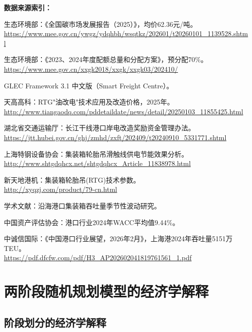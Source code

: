 \documentclass[12pt,a4paper]{article}
\newcommand{\手批注}[2]{\textcolor{#1}{\text{\kaishu #2}}}
\newcommand{\一阶段}{\textcolor{firststage}{\text{\kaishu （一阶段）}}}
\newcommand{\二阶段}{\textcolor{secondstage}{\text{\kaishu （二阶段）}}}
\begin{document}
\vspace{1em}
\noindent\textbf{数据来源索引：}
\begin{footnotesize}
\begin{enumerate}[itemsep=0.15em,leftmargin=1.5em,label={[\arabic*]}]
    \item 生态环境部：《全国碳市场发展报告（2025）》，均价62.36元/吨。\\ \url{https://www.mee.gov.cn/ywgz/ydqhbh/wsqtkz/202601/t20260101_1139528.shtml}
    \item 生态环境部：《2023、2024年度配额总量和分配方案》，预分配70\%。\\ \url{https://www.mee.gov.cn/xxgk2018/xxgk/xxgk03/202410/}
    \item GLEC Framework 3.1 中文版（Smart Freight Centre）。
    \item 天高高科：RTG"油改电"技术应用及改造价格，2025年。\\ \url{http://www.tiangaodq.com/pddetaildate/news/detail/20250103_11855425.html}
    \item 湖北省交通运输厅：长江干线港口岸电改造奖励资金管理办法。\\ \url{https://jtt.hubei.gov.cn/ghj/zmhd/zxft/202409/t20240910_5331771.shtml}
    \item 上海特钢设备协会：集装箱轮胎吊滑触线供电节能效果分析。\\ \url{http://www.shtgdqhcx.net/shtgdqhcx_Article_11838978.html}
    \item 新天地港机：集装箱轮胎吊(RTG)技术参数。\\ \url{http://xyqzj.com/product/79-cn.html}
    \item 学术文献：沿海港口集装箱吞吐量季节性波动研究。
    \item 中国资产评估协会：港口行业2024年WACC平均值9.44\%。
    \item 中诚信国际：《中国港口行业展望，2026年2月》，上海港2024年吞吐量5151万TEU。\\ \url{https://pdf.dfcfw.com/pdf/H3_AP202602041819761561_1.pdf}
\end{enumerate}
\end{footnotesize}


\newpage
\section{两阶段随机规划模型的经济学解释}

\subsection{阶段划分的经济学解释}
\end{document}
